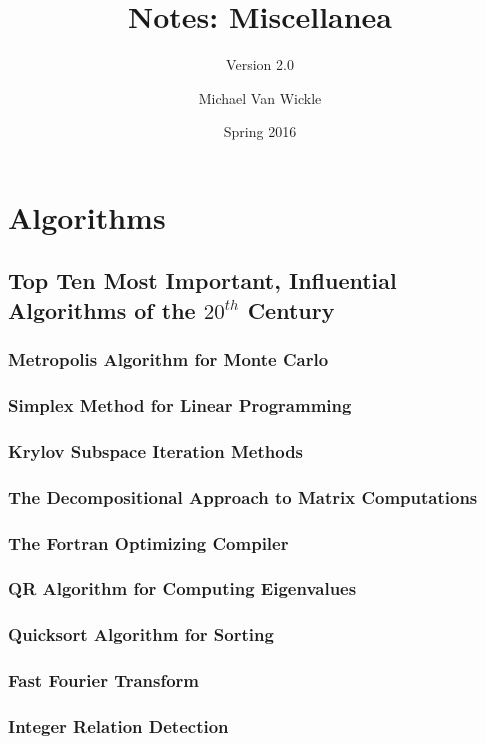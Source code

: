 \documentclass[10pt,letterpaper]{scrartcl}
\title{Notes: Miscellanea}
\subtitle{Version 2.0}
\author{Michael Van Wickle}
\date{Spring 2016}
\begin{document}
\maketitle\newpage\tableofcontents

\newpage\section{Algorithms}
\subsection[IEEE 2000]{Top Ten Most Important, Influential Algorithms of the $20^{th}$ Century}
\subsubsection[Metropolis]{Metropolis Algorithm for Monte Carlo}
\subsubsection{Simplex Method for Linear Programming}
\subsubsection{Krylov Subspace Iteration Methods}
\subsubsection{The Decompositional Approach to Matrix Computations}
\subsubsection[Fortran]{The Fortran Optimizing Compiler}
\subsubsection[QR Algorithm]{QR Algorithm for Computing Eigenvalues}
\subsubsection[Quicksort]{Quicksort Algorithm for Sorting}
\subsubsection[FFT]{Fast Fourier Transform}
\subsubsection{Integer Relation Detection}
\end{document}
